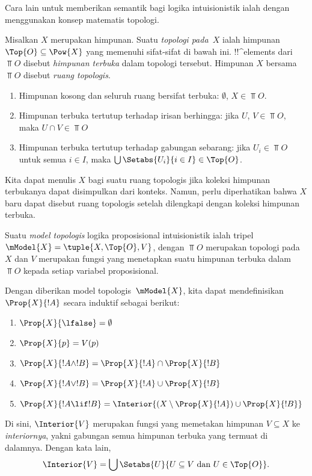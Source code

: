 \documentclass[../../../include/open-logic-section]{subfiles}
\begin{document}


Cara lain untuk memberikan semantik bagi logika intuisionistik ialah dengan
menggunakan konsep matematis topologi.

\begin{defn}
  Misalkan $X$ merupakan himpunan. Suatu \emph{topologi pada~$X$} ialah
  himpunan $\Top{O}\subseteq\Pow{X}$ yang memenuhi sifat-sifat di bawah ini.
  !!^{element}s dari~$\Top{O}$ disebut \emph{himpunan terbuka} dalam topologi
  tersebut. Himpunan $X$ bersama $\Top{O}$ disebut \emph{ruang topologis}.
  \begin{enumerate}
  \item Himpunan kosong dan seluruh ruang bersifat terbuka:
    $\emptyset$, $X\in\Top{O}$.
  \item Himpunan terbuka tertutup terhadap irisan berhingga: jika
    $U$, $V\in\Top{O}$, maka $U\cap V\in\Top{O}$
  \item Himpunan terbuka tertutup terhadap gabungan sebarang: jika
    $U_i\in\Top{O}$ untuk semua $i\in I$, maka
    $\bigcup\Setabs{U_i}{i\in I}\in\Top{O}$.
  \end{enumerate}
\end{defn}

Kita dapat menulis $X$ bagi suatu ruang topologis jika koleksi himpunan
terbukanya dapat disimpulkan dari konteks. Namun, perlu diperhatikan bahwa
$X$ baru dapat disebut ruang topologis setelah dilengkapi dengan koleksi
himpunan terbuka.

\begin{defn}
  Suatu \emph{model topologis} logika proposisional intuisionistik ialah
  tripel $\mModel{X}=\tuple{X,\Top{O},V}$, dengan $\Top{O}$ merupakan topologi
  pada~$X$ dan $V$ merupakan fungsi yang menetapkan suatu himpunan terbuka
  dalam $\Top{O}$ kepada setiap variabel proposisional.

  Dengan diberikan model topologis~$\mModel{X}$, kita dapat mendefinisikan
  $\Prop{X}{!A}$ secara induktif sebagai berikut:
  \begin{enumerate}
  \item $\Prop{X}{\lfalse}=\emptyset$
  \item $\Prop{X}{p}=V(p)$
  \item $\Prop{X}{!A\land !B}=\Prop{X}{!A}\cap\Prop{X}{!B}$
  \item $\Prop{X}{!A\lor !B}=\Prop{X}{!A}\cup\Prop{X}{!B}$
  \item $\Prop{X}{!A\lif !B}=\Interior{(X\setminus\Prop{X}{!A})\cup
    \Prop{X}{!B}}$
  \end{enumerate}
  Di sini, $\Interior{V}$ merupakan fungsi yang memetakan himpunan
  $V\subseteq X$ ke \emph{interiornya}, yakni gabungan semua himpunan terbuka
  yang termuat di dalamnya. Dengan kata lain,
  \[
  \Interior{V}=\bigcup\Setabs{U}{U\subseteq V\text{ dan }U\in\Top{O}}.
  \]
\end{defn}
\end{document}
